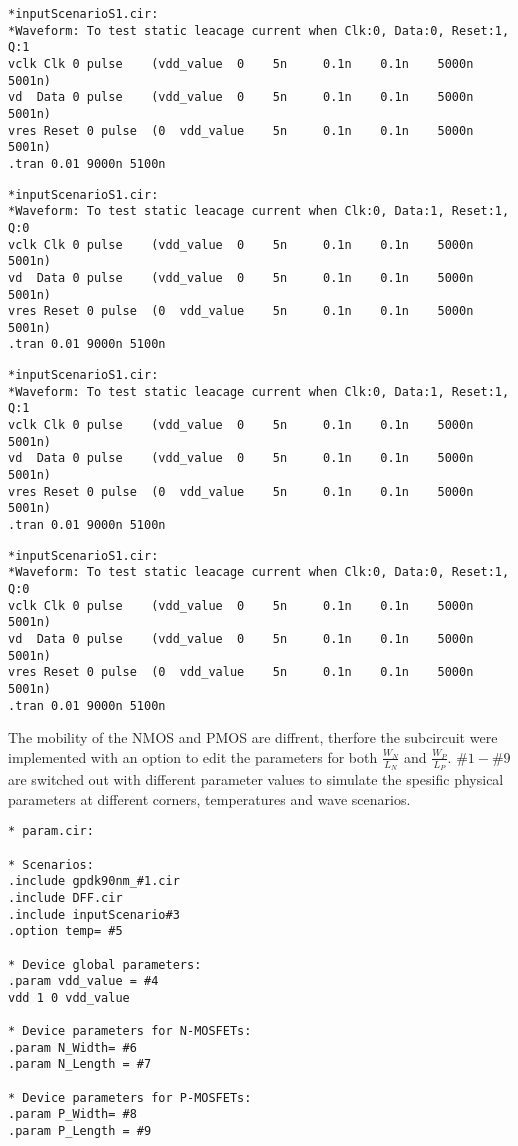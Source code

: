 \begin{lstlisting}
*inputScenarioS1.cir:
*Waveform: To test static leacage current when Clk:0, Data:0, Reset:1, Q:1
vclk Clk 0 pulse    (vdd_value  0    5n     0.1n    0.1n    5000n     5001n)     
vd  Data 0 pulse    (vdd_value  0    5n     0.1n    0.1n    5000n     5001n)   
vres Reset 0 pulse  (0  vdd_value    5n     0.1n    0.1n    5000n     5001n)   
.tran 0.01 9000n 5100n
\end{lstlisting}
\begin{lstlisting}
*inputScenarioS1.cir:
*Waveform: To test static leacage current when Clk:0, Data:1, Reset:1, Q:0
vclk Clk 0 pulse    (vdd_value  0    5n     0.1n    0.1n    5000n     5001n)     
vd  Data 0 pulse    (vdd_value  0    5n     0.1n    0.1n    5000n     5001n)   
vres Reset 0 pulse  (0  vdd_value    5n     0.1n    0.1n    5000n     5001n)   
.tran 0.01 9000n 5100n
\end{lstlisting}
\begin{lstlisting}
*inputScenarioS1.cir:
*Waveform: To test static leacage current when Clk:0, Data:1, Reset:1, Q:1
vclk Clk 0 pulse    (vdd_value  0    5n     0.1n    0.1n    5000n     5001n)     
vd  Data 0 pulse    (vdd_value  0    5n     0.1n    0.1n    5000n     5001n)   
vres Reset 0 pulse  (0  vdd_value    5n     0.1n    0.1n    5000n     5001n)   
.tran 0.01 9000n 5100n
\end{lstlisting}
\begin{lstlisting}
*inputScenarioS1.cir:
*Waveform: To test static leacage current when Clk:0, Data:0, Reset:1, Q:0
vclk Clk 0 pulse    (vdd_value  0    5n     0.1n    0.1n    5000n     5001n)     
vd  Data 0 pulse    (vdd_value  0    5n     0.1n    0.1n    5000n     5001n)   
vres Reset 0 pulse  (0  vdd_value    5n     0.1n    0.1n    5000n     5001n)   
.tran 0.01 9000n 5100n
\end{lstlisting}

The mobility of the NMOS and PMOS are diffrent, therfore the subcircuit were implemented with an option to edit the parameters for both $\frac{W_N}{L_N}$ and $\frac{W_P}{L_P}$. $\#1-\#9$ are switched out with different parameter values to simulate the spesific physical parameters at different corners, temperatures and wave scenarios.

\begin{lstlisting}
* param.cir:

* Scenarios:
.include gpdk90nm_#1.cir 
.include DFF.cir
.include inputScenario#3
.option temp= #5

* Device global parameters:
.param vdd_value = #4
vdd 1 0 vdd_value

* Device parameters for N-MOSFETs:
.param N_Width= #6
.param N_Length = #7

* Device parameters for P-MOSFETs:
.param P_Width= #8
.param P_Length = #9
\end{lstlisting}

